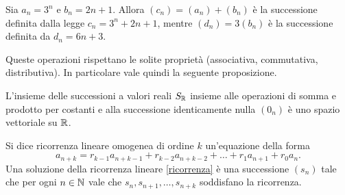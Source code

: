 \begin{example}
    Sia $a_n = 3^n$ e $b_n = 2n + 1$. Allora $(c_n) = (a_n) + (b_n)$ è la successione definita dalla legge $c_n = 3^n + 2n + 1$, mentre $(d_n) = 3(b_n)$ è la successione definita da $d_n = 6n + 3$.
\end{example}

Queste operazioni rispettano le solite proprietà (associativa, commutativa, distributiva). In particolare vale quindi la seguente proposizione.

\begin{proposition}
    L'insieme delle successioni a valori reali $S_{\mathbb{R}}$ insieme alle operazioni di somma e prodotto per costanti e alla successione identicamente nulla $(0_n)$ è uno spazio vettoriale su $\mathbb{R}$.
\end{proposition}

\begin{definition}
    Si dice ricorrenza lineare omogenea di ordine $k$ un'equazione della forma \begin{equation} \label{ricorrenza}
        a_{n+k} = r_{k-1}a_{n+k-1} + r_{k-2}a_{n+k-2} + \dots + r_{1}a_{n+1} + r_0a_n. 
    \end{equation}
    Una soluzione della ricorrenza lineare \ref{ricorrenza} è una successione $(s_n)$ tale che per ogni $n \in \mathbb{N}$ vale che $s_n, s_{n+1}, \dots, s_{n+k}$ soddisfano la ricorrenza.
\end{definition}

